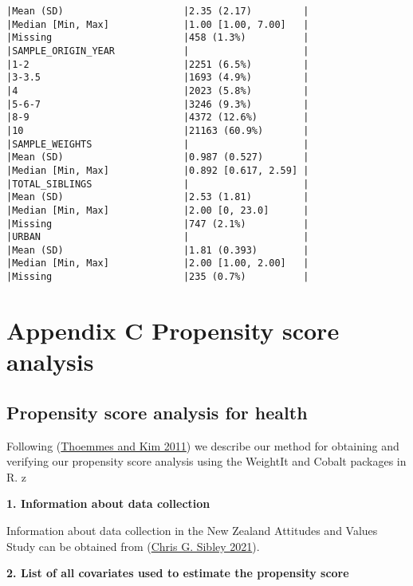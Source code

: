 \documentclass[
  singlecolumn]{report}
\begin{document}
\begin{verbatim}
|Mean (SD)                     |2.35 (2.17)         |
|Median [Min, Max]             |1.00 [1.00, 7.00]   |
|Missing                       |458 (1.3%)          |
|SAMPLE_ORIGIN_YEAR            |                    |
|1-2                           |2251 (6.5%)         |
|3-3.5                         |1693 (4.9%)         |
|4                             |2023 (5.8%)         |
|5-6-7                         |3246 (9.3%)         |
|8-9                           |4372 (12.6%)        |
|10                            |21163 (60.9%)       |
|SAMPLE_WEIGHTS                |                    |
|Mean (SD)                     |0.987 (0.527)       |
|Median [Min, Max]             |0.892 [0.617, 2.59] |
|TOTAL_SIBLINGS                |                    |
|Mean (SD)                     |2.53 (1.81)         |
|Median [Min, Max]             |2.00 [0, 23.0]      |
|Missing                       |747 (2.1%)          |
|URBAN                         |                    |
|Mean (SD)                     |1.81 (0.393)        |
|Median [Min, Max]             |2.00 [1.00, 2.00]   |
|Missing                       |235 (0.7%)          |
\end{verbatim}

\newpage{}

\hypertarget{appendix-c-propensity-score-analysis}{%
\section{Appendix C Propensity score
analysis}\label{appendix-c-propensity-score-analysis}}

\hypertarget{propensity-score-analysis-for-health}{%
\subsection{Propensity score analysis for
health}\label{propensity-score-analysis-for-health}}

Following (\protect\hyperlink{ref-thoemmes2011}{Thoemmes and Kim 2011})
we describe our method for obtaining and verifying our propensity score
analysis using the WeightIt and Cobalt packages in R. z

\textbf{1. Information about data collection}

Information about data collection in the New Zealand Attitudes and
Values Study can be obtained from
(\protect\hyperlink{ref-sibley2021}{Chris G. Sibley 2021}).

\textbf{2. List of all covariates used to estimate the propensity score}
\end{document}
